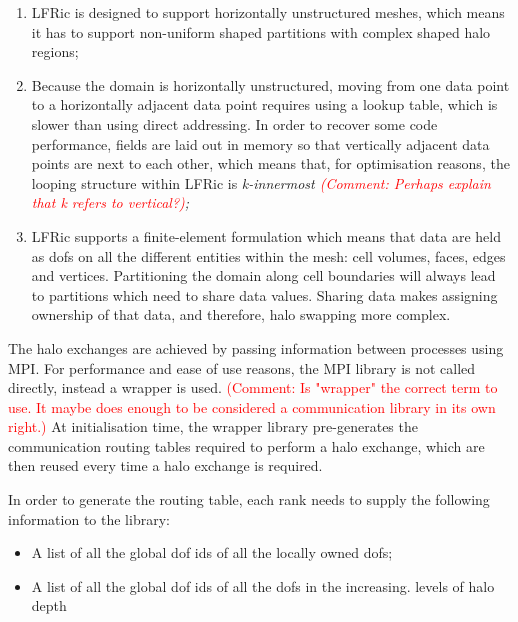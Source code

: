 \documentclass[times]{elsarticle}
\begin{document}
\begin{enumerate}

\item LFRic is designed to support horizontally unstructured meshes,
which means it has to support non-uniform shaped partitions with complex
shaped halo regions;

\item Because the domain is horizontally unstructured, moving from one
data point to a horizontally adjacent data point requires using a lookup
table, which is slower than using direct addressing. In order to recover
some code performance, fields are laid out in memory so that vertically
adjacent data points are next to each other, which means that, for
optimisation reasons, the looping structure within LFRic is \em{k}-innermost
\textcolor{red}{\em (Comment: Perhaps explain that k refers to vertical?)};

\item LFRic supports a finite-element formulation which means that data
are held as dofs on all the different entities within the mesh: cell 
volumes, faces, edges and vertices.
Partitioning the domain along cell boundaries will always lead to
partitions which need to share data values. Sharing data makes assigning
ownership of that data, and therefore, halo swapping more complex.

\end{enumerate}

The halo exchanges are achieved by passing information between processes
using MPI. For performance and ease of use reasons, the MPI library is
not called directly, instead a wrapper is used. 
\textcolor{red}{(Comment: Is "wrapper" the correct term to use. It maybe 
does enough to be considered a communication library in its own right.)}
At initialisation time,
the wrapper library pre-generates the communication routing tables
required to perform a halo exchange, which are then reused every time a
halo exchange is required.

In order to generate the routing table, each rank needs to supply the
following information to the library:

\begin{itemize}

\item A list of all the global dof ids of all the locally owned dofs;

\item A list of all the global dof ids of all the dofs in the increasing.
levels of halo depth 

\end{itemize}
\end{document}
